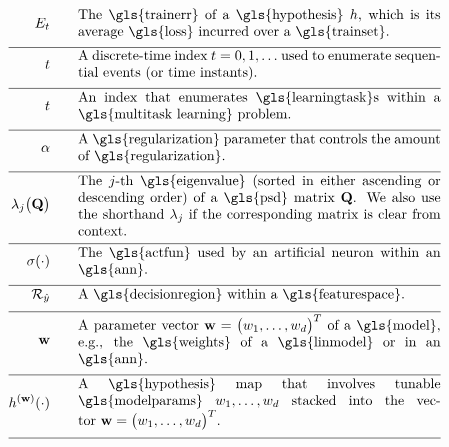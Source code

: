 \begin{align}
	\trainerror \quad\quad &\parbox{.75\textwidth}{The \gls{trainerr} of a \gls{hypothesis} $\hypothesis$, which is its 
		average \gls{loss} incurred over a \gls{trainset}. }\nonumber \\[2mm] \hline \nonumber\\[-5mm]
	\timeidx \quad\quad &\parbox{.75\textwidth}{A discrete-time index $\timeidx=0,1,\ldots$ used to 
		enumerate sequential events (or time instants). }\nonumber \\[2mm] \hline \nonumber\\[-5mm]
	\taskidx \quad\quad &\parbox{.75\textwidth}{An index that enumerates
		\gls{learningtask}s within a \gls{multitask learning} problem.}\nonumber \\[2mm] \hline \nonumber\\[-5mm]
	\regparam \quad\quad &\parbox{.75\textwidth}{A \gls{regularization} parameter that controls 
		the amount of \gls{regularization}. } \nonumber \\[2mm] \hline \nonumber\\[-5mm]
	\eigval{\featureidx}\big( \mathbf{Q} \big) \quad\quad &\parbox{.75\textwidth}{The $\featureidx$-th 
		\gls{eigenvalue} (sorted in either ascending or descending order) of a \gls{psd} matrix $\mathbf{Q}$. We also 
		use the shorthand $\eigval{\featureidx}$ if the corresponding matrix is clear from context. }\nonumber \\[2mm] \hline \nonumber\\[-5mm]
	\actfun(\cdot) \quad\quad &\parbox{.75\textwidth}{The \gls{actfun} used by an artificial neuron within an \gls{ann}.}\nonumber \\[2mm] \hline \nonumber\\[-5mm]
	\decreg{\hat{\truelabel}} \quad\quad &\parbox{.75\textwidth}{A \gls{decisionregion} within a \gls{featurespace}.  }\nonumber \\[2mm] \hline \nonumber\\[-5mm]  
	\weights  \quad\quad & \parbox{.75\textwidth}{A parameter vector $\weights = \big(\weight_{1},\ldots,\weight_{\featuredim}\big)^{T}$ 
		of a \gls{model}, e.g., the \gls{weights} of a \gls{linmodel} or in an \gls{ann}.}     \nonumber \\[2mm] \hline \nonumber\\[-5mm]
	\hypothesis^{(\weights)}(\cdot)  \quad\quad &\parbox{.75\textwidth}{A \gls{hypothesis} map that involves tunable \gls{modelparams} $\weight_{1},\ldots,\weight_{\featuredim}$ stacked into the vector $\weights=\big(\weight_{1},\ldots,\weight_{\featuredim} \big)^{T}$.} \nonumber \\[2mm] \hline \nonumber\\[-5mm]

\end{align}
